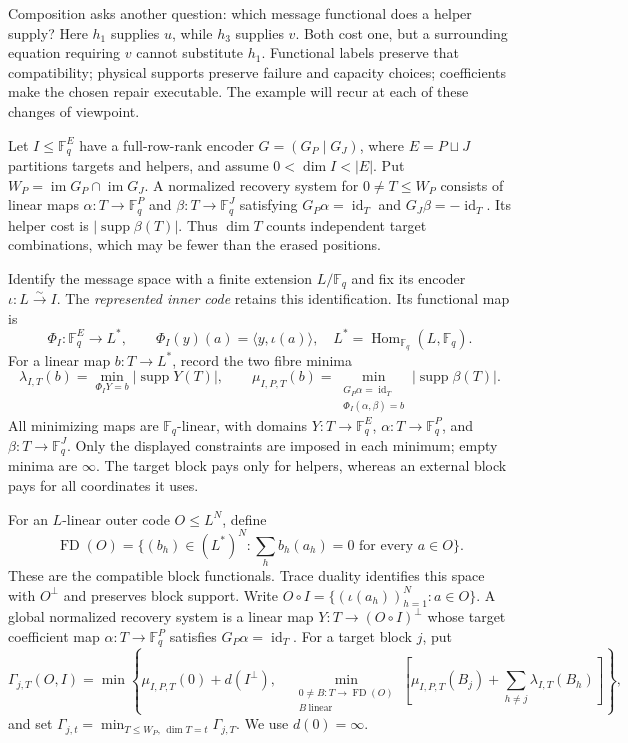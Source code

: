 \documentclass[11pt]{article}
\theoremstyle{definition}
\newcommand{\F}{\mathbb F}
\newcommand{\supp}{\operatorname{supp}}
\begin{document}
Composition asks another question: which message functional does a helper
supply?  Here $h_1$ supplies $u$, while $h_3$ supplies $v$.  Both cost one,
but a surrounding equation requiring $v$ cannot substitute $h_1$.
Functional labels preserve that compatibility; physical supports preserve
failure and capacity choices; coefficients make the chosen repair executable.
The example will recur at each of these changes of viewpoint.

Let $I\leq\F_q^E$ have a full-row-rank encoder $G=(G_P\mid G_J)$,
where $E=P\sqcup J$ partitions targets and helpers, and assume
$0<\dim I<|E|$.  Put
$W_P=\operatorname{im}G_P\cap\operatorname{im}G_J$.
A normalized recovery system for $0\ne T\leq W_P$ consists of linear maps
$\alpha:T\to\F_q^P$ and $\beta:T\to\F_q^J$ satisfying
$G_P\alpha=\operatorname{id}_T$ and $G_J\beta=-\operatorname{id}_T$.
Its helper cost is $|\supp\beta(T)|$.  Thus $\dim T$ counts independent
target combinations, which may be fewer than the erased positions.

Identify the message space with a finite extension $L/\F_q$ and fix its
encoder $\iota:L\xrightarrow{\sim}I$.  The \emph{represented inner code}
retains this identification.  Its functional map is
\[
 \Phi_I:\F_q^E\longrightarrow L^*,\qquad
 \Phi_I(y)(a)=\langle y,\iota(a)\rangle,
 \quad L^*=\operatorname{Hom}_{\F_q}(L,\F_q).
\]
For a linear map $b:T\to L^*$, record the two fibre minima
\[
 \lambda_{I,T}(b)=\min_{\Phi_IY=b}|\supp Y(T)|,
 \qquad
 \mu_{I,P,T}(b)=
 \min_{\substack{G_P\alpha=\operatorname{id}_T\\
                  \Phi_I(\alpha,\beta)=b}}|\supp\beta(T)|.
\]
All minimizing maps are $\F_q$-linear, with domains
$Y:T\to\F_q^E$, $\alpha:T\to\F_q^P$, and $\beta:T\to\F_q^J$.
Only the displayed constraints are imposed in each minimum; empty minima
are $\infty$.
The target block pays only for helpers, whereas an external block pays for
all coordinates it uses.

For an $L$-linear outer code $O\leq L^N$, define
\[
 \operatorname{FD}(O)=
 \{(b_h)\in(L^*)^N:\textstyle\sum_h b_h(a_h)=0
                              \text{ for every }a\in O\}.
\]
These are the compatible block functionals.  Trace duality identifies this
space with $O^\perp$ and preserves block support.  Write
$O\circ I=\{(\iota(a_h))_{h=1}^N:a\in O\}$.
A global normalized recovery system is a linear map
$Y:T\to(O\circ I)^\perp$ whose target coefficient map
$\alpha:T\to\F_q^P$ satisfies $G_P\alpha=\operatorname{id}_T$.
For a target block $j$, put
\[
 \Gamma_{j,T}(O,I)=\min\left\{
 \mu_{I,P,T}(0)+d(I^\perp),\quad
 \min_{\substack{0\ne B:T\to\operatorname{FD}(O)\\B\ \mathrm{linear}}}
 \left[\mu_{I,P,T}(B_j)+\sum_{h\ne j}\lambda_{I,T}(B_h)\right]
 \right\},
\]
and set $\Gamma_{j,t}=\min_{T\leq W_P,\,\dim T=t}\Gamma_{j,T}$.
We use $d(0)=\infty$.
\end{document}
